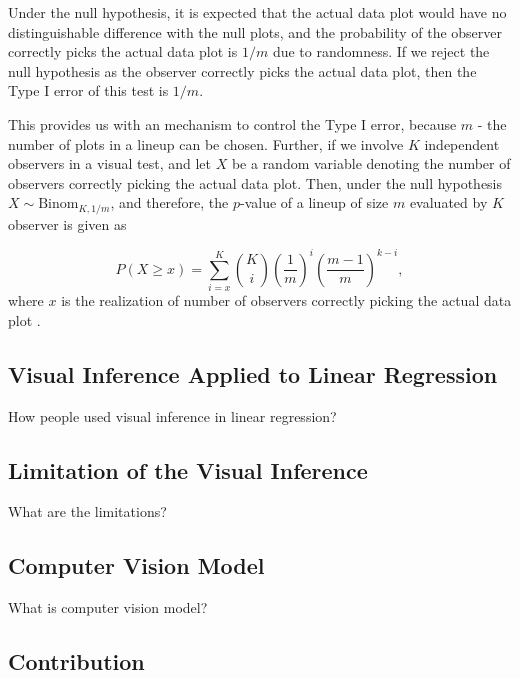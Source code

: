 \documentclass{monashthesis}
\begin{document}
Under the null hypothesis, it is expected that the actual data plot would have no distinguishable difference with the null plots, and the probability of the observer correctly picks the actual data plot is \(1/m\) due to randomness. If we reject the null hypothesis as the observer correctly picks the actual data plot, then the Type I error of this test is \(1/m\).

This provides us with an mechanism to control the Type I error, because \(m\) - the number of plots in a lineup can be chosen. Further, if we involve \(K\) independent observers in a visual test, and let \(X\) be a random variable denoting the number of observers correctly picking the actual data plot. Then, under the null hypothesis \(X \sim \mathrm{Binom}_{K,1/m}\), and therefore, the \(p\)-value of a lineup of size \(m\) evaluated by \(K\) observer is given as

\[P(X \geq x) = \sum_{i=x}^{K}{{K}\choose{i}}\left(\frac{1}{m}\right)^i\left(\frac{m-1}{m}\right)^{k-i},\]
where \(x\) is the realization of number of observers correctly picking the actual data plot \autocite{majumder_validation_2013}.

\hypertarget{visual-inference-applied-to-linear-regression}{%
\subsection{Visual Inference Applied to Linear Regression}\label{visual-inference-applied-to-linear-regression}}

How people used visual inference in linear regression?

\hypertarget{limitation-of-the-visual-inference}{%
\subsection{Limitation of the Visual Inference}\label{limitation-of-the-visual-inference}}

What are the limitations?

\hypertarget{computer-vision-model}{%
\subsection{Computer Vision Model}\label{computer-vision-model}}

What is computer vision model?

\hypertarget{contribution}{%
\subsection{Contribution}\label{contribution}}
\end{document}
